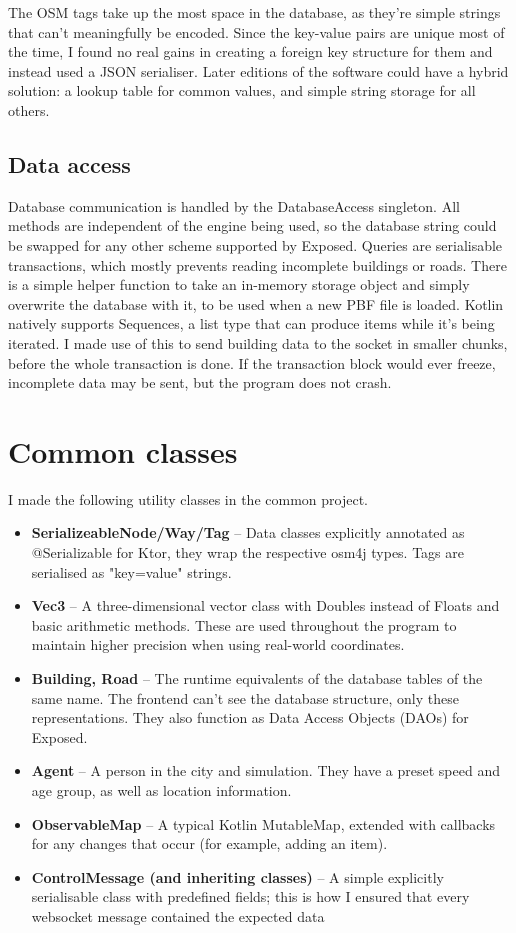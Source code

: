 The OSM tags take up the most space in the database, as they're simple strings that can't meaningfully be encoded. Since the key-value pairs are unique most of the time, I found no real gains in creating a foreign key structure for them and instead used a JSON serialiser. Later editions of the software could have a hybrid solution: a lookup table for common values, and simple string storage for all others.



\subsection{Data access}

Database communication is handled by the DatabaseAccess singleton. All methods are independent of the engine being used, so the database string could be swapped for any other scheme supported by Exposed. Queries are serialisable transactions, which mostly prevents reading incomplete buildings or roads. There is a simple helper function to take an in-memory storage object and simply overwrite the database with it, to be used when a new PBF file is loaded. Kotlin natively supports Sequences, a list type that can produce items while it's being iterated. I made use of this to send building data to the socket in smaller chunks, before the whole transaction is done. If the transaction block would ever freeze, incomplete data may be sent, but the program does not crash.

\section{Common classes}

I made the following utility classes in the common project. \begin{itemize}
    \item \textbf{SerializeableNode/Way/Tag} -- Data classes explicitly annotated as @Serializable for Ktor, they wrap the respective osm4j types. Tags are serialised as "key=value" strings.
    \item \textbf{Vec3} -- A three-dimensional vector class with Doubles instead of Floats and basic arithmetic methods. These are used throughout the program to maintain higher precision when using real-world coordinates.
    \item \textbf{Building, Road} -- The runtime equivalents of the database tables of the same name. The frontend can't see the database structure, only these representations. They also function as Data Access Objects (DAOs) for Exposed.
    \item \textbf{Agent} -- A person in the city and simulation. They have a preset speed and age group, as well as location information.
    \item \textbf{ObservableMap} -- A typical Kotlin MutableMap, extended with callbacks for any changes that occur (for example, adding an item).
    \item \textbf{ControlMessage (and inheriting classes)} -- A simple explicitly serialisable class with predefined fields; this is how I ensured that every websocket message contained the expected data
\end{itemize}

